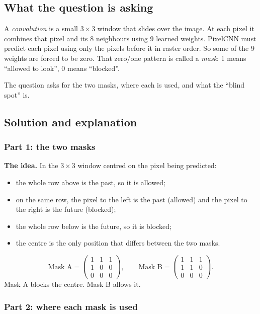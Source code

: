 \documentclass[12pt,a4paper]{article}
\begin{document}
\subsection{What the question is asking}

A \emph{convolution} is a small $3 \times 3$ window that slides over the image. At each pixel it combines that pixel and its 8 neighbours using 9 learned weights. PixelCNN must predict each pixel using only the pixels before it in raster order. So some of the 9 weights are forced to be zero. That zero/one pattern is called a \emph{mask}: 1 means ``allowed to look'', 0 means ``blocked''.

The question asks for the two masks, where each is used, and what the ``blind spot'' is.

\subsection{Solution and explanation}

\subsubsection{Part 1: the two masks}

\textbf{The idea.} In the $3\times3$ window centred on the pixel being predicted:
\begin{itemize}[leftmargin=*]
\item the whole row above is the past, so it is allowed;
\item on the same row, the pixel to the left is the past (allowed) and the pixel to the right is the future (blocked);
\item the whole row below is the future, so it is blocked;
\item the centre is the only position that differs between the two masks.
\end{itemize}

\[
\text{Mask A} = \begin{pmatrix} 1 & 1 & 1 \\ 1 & 0 & 0 \\ 0 & 0 & 0 \end{pmatrix}, \qquad
\text{Mask B} = \begin{pmatrix} 1 & 1 & 1 \\ 1 & 1 & 0 \\ 0 & 0 & 0 \end{pmatrix}.
\]
Mask A blocks the centre. Mask B allows it.

\subsubsection{Part 2: where each mask is used}
\end{document}
